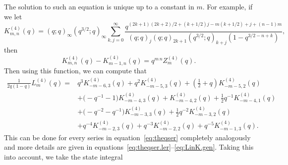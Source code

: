 \documentclass[pdftex]{sigma}
\numberwithin{equation}{section}
\begin{document}
The solution to such an equation is unique up to a constant in $m$.
For example, if we let
\[
 K^{(4)}_{m,n}(q)
  =
 (q;q)_{\infty}(q^{3/2};q)_{\infty}\sum_{k,j=0}^{\infty}\frac{q^{(2k+1)(2k+2)/2+(k+1/2)j-m(k+1/2)+j+(n-1)m}}{(q;q)_{j}(q;q)_{2k+1}(q^{3/2};q)_{k+j}(1-q^{3/2-n+k})} ,
\]
then
\[
 K^{(4)}_{m,n}(q)-K^{(4)}_{m-1,n}(q)
  =
 q^{m\,n}Z^{(4)}_{m}(q) .
\]
Then using this function, we can compute that
\begin{align}
 \frac{1}{2q(1-q)}L^{(4)}_{m}(q)
 ={}&q^{3}K^{(4)}_{-m-6,3}(q)
 +q^{2}K^{(4)}_{-m-5,3}(q) + \left(\frac{1}{2} + q\right)K^{(4)}_{-m-5,2}(q)\nonumber\\
 & +\bigl(-q^{-1} - 1\bigr)K^{(4)}_{-m-4,3}(q) + K^{(4)}_{-m-4,2}(q) + \frac{1}{2}q^{-1}K^{(4)}_{-m-4,1}(q)\nonumber\\
 & +\bigl(-q^{-2} - q^{-1}\bigr)K^{(4)}_{-m-3,3}(q) + \frac{1}{2}q^{-2}K^{(4)}_{-m-3,2}(q)\nonumber\\
 & +q^{-4}K^{(4)}_{-m-2,3}(q) + q^{-3}K^{(4)}_{-m-2,2}(q)
 +q^{-5}K^{(4)}_{-m-1,3}(q).\label{eq:LinK}
\end{align}
This can be done for every series in equation~\eqref{eq:theqser} completely analogously and more details are given in equations~\eqref{eq:theqser.ler}--\eqref{eq:LinK.gen}.
Taking this into account, we take the state integral
\end{document}
